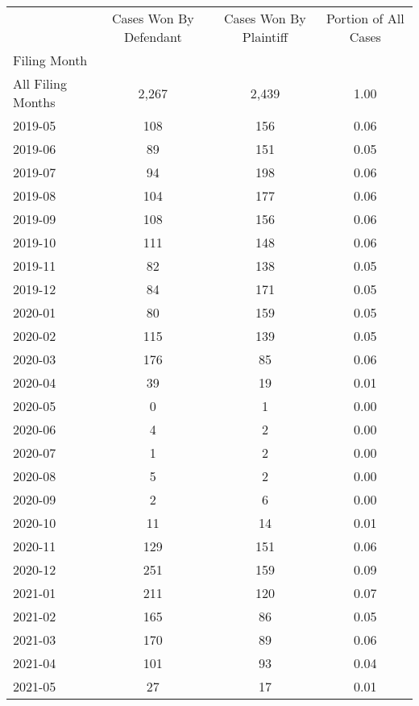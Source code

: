 \begin{tabular}{lccc}
\toprule
 & Cases Won By Defendant & Cases Won By Plaintiff & Portion of All Cases \\
Filing Month &  &  &  \\
\midrule
All Filing Months & 2,267 & 2,439 & 1.00 \\
2019-05 & 108 & 156 & 0.06 \\
2019-06 & 89 & 151 & 0.05 \\
2019-07 & 94 & 198 & 0.06 \\
2019-08 & 104 & 177 & 0.06 \\
2019-09 & 108 & 156 & 0.06 \\
2019-10 & 111 & 148 & 0.06 \\
2019-11 & 82 & 138 & 0.05 \\
2019-12 & 84 & 171 & 0.05 \\
2020-01 & 80 & 159 & 0.05 \\
2020-02 & 115 & 139 & 0.05 \\
2020-03 & 176 & 85 & 0.06 \\
2020-04 & 39 & 19 & 0.01 \\
2020-05 & 0 & 1 & 0.00 \\
2020-06 & 4 & 2 & 0.00 \\
2020-07 & 1 & 2 & 0.00 \\
2020-08 & 5 & 2 & 0.00 \\
2020-09 & 2 & 6 & 0.00 \\
2020-10 & 11 & 14 & 0.01 \\
2020-11 & 129 & 151 & 0.06 \\
2020-12 & 251 & 159 & 0.09 \\
2021-01 & 211 & 120 & 0.07 \\
2021-02 & 165 & 86 & 0.05 \\
2021-03 & 170 & 89 & 0.06 \\
2021-04 & 101 & 93 & 0.04 \\
2021-05 & 27 & 17 & 0.01 \\
\bottomrule
\end{tabular}
